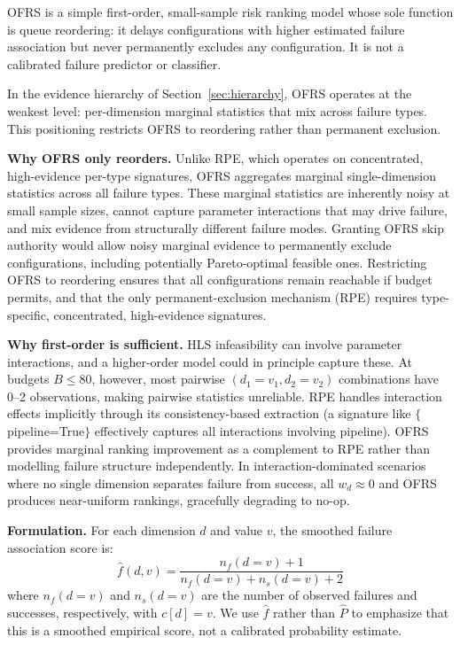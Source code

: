 \documentclass[journal]{IEEEtran}
\begin{document}
OFRS is a simple first-order, small-sample risk ranking model whose sole function is queue reordering: it delays configurations with higher estimated failure association but never permanently excludes any configuration. It is not a calibrated failure predictor or classifier.

In the evidence hierarchy of Section~\ref{sec:hierarchy}, OFRS operates at the weakest level: per-dimension marginal statistics that mix across failure types. This positioning restricts OFRS to reordering rather than permanent exclusion.

\textbf{Why OFRS only reorders.} Unlike RPE, which operates on concentrated, high-evidence per-type signatures, OFRS aggregates marginal single-dimension statistics across all failure types. These marginal statistics are inherently noisy at small sample sizes, cannot capture parameter interactions that may drive failure, and mix evidence from structurally different failure modes. Granting OFRS skip authority would allow noisy marginal evidence to permanently exclude configurations, including potentially Pareto-optimal feasible ones. Restricting OFRS to reordering ensures that all configurations remain reachable if budget permits, and that the only permanent-exclusion mechanism (RPE) requires type-specific, concentrated, high-evidence signatures.

\textbf{Why first-order is sufficient.} HLS infeasibility can involve parameter interactions, and a higher-order model could in principle capture these. At budgets $B \leq 80$, however, most pairwise $(d_1{=}v_1, d_2{=}v_2)$ combinations have 0--2 observations, making pairwise statistics unreliable. RPE handles interaction effects implicitly through its consistency-based extraction (a signature like $\{$pipeline=True$\}$ effectively captures all interactions involving pipeline). OFRS provides marginal ranking improvement as a complement to RPE rather than modelling failure structure independently. In interaction-dominated scenarios where no single dimension separates failure from success, all $w_d \approx 0$ and OFRS produces near-uniform rankings, gracefully degrading to no-op.

\textbf{Formulation.} For each dimension $d$ and value $v$, the smoothed failure association score is:
\begin{equation}
\hat{f}(d, v) = \frac{n_f(d{=}v) + 1}{n_f(d{=}v) + n_s(d{=}v) + 2}
\label{eq:ofrs_f}
\end{equation}
where $n_f(d{=}v)$ and $n_s(d{=}v)$ are the number of observed failures and successes, respectively, with $c[d] = v$. We use $\hat{f}$ rather than $\hat{P}$ to emphasize that this is a smoothed empirical score, not a calibrated probability estimate.
\end{document}
